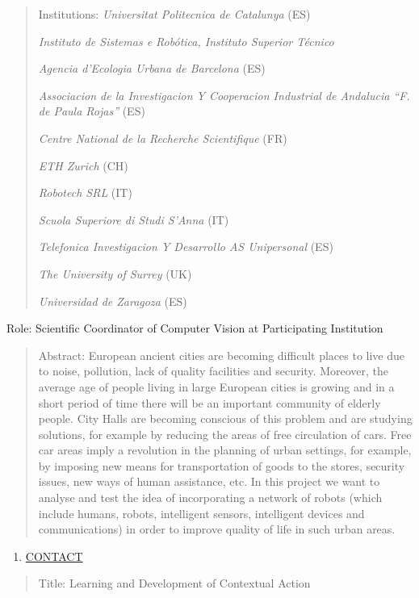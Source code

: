 \begin{quote}
Institutions: \emph{Universitat Politecnica de Catalunya} (ES)

\emph{Instituto de Sistemas e Robótica, Instituto Superior Técnico}

\emph{Agencia d'Ecologia Urbana de Barcelona} (ES)

\emph{Associacion de la Investigacion Y Cooperacion Industrial de
Andalucia ``F. de Paula Rojas''} (ES)

\emph{Centre National de la Recherche Scientifique} (FR)

\emph{ETH Zurich} (CH)

\emph{Robotech SRL} (IT)

\emph{Scuola Superiore di Studi S'Anna} (IT)

\emph{Telefonica Investigacion Y Desarrollo AS Unipersonal} (ES)

\emph{The University of Surrey} (UK)

\emph{Universidad de Zaragoza} (ES)
\end{quote}

Role: Scientific Coordinator of Computer Vision at Participating
Institution

\begin{quote}
Abstract: European ancient cities are becoming difficult places to live
due to noise, pollution, lack of quality facilities and security.
Moreover, the average age of people living in large European cities is
growing and in a short period of time there will be an important
community of elderly people. City Halls are becoming conscious of this
problem and are studying solutions, for example by reducing the areas of
free circulation of cars. Free car areas imply a revolution in the
planning of urban settings, for example, by imposing new means for
transportation of goods to the stores, security issues, new ways of
human assistance, etc. In this project we want to analyse and test the
idea of incorporating a network of robots (which include humans, robots,
intelligent sensors, intelligent devices and communications) in order to
improve quality of life in such urban areas.
\end{quote}

\begin{enumerate}
\def\labelenumi{\arabic{enumi}.}
\setcounter{enumi}{13}
\item
  \ul{CONTACT}
\end{enumerate}

\begin{quote}
Title: Learning and Development of Contextual Action
\end{quote}

